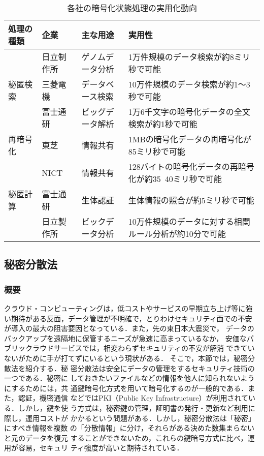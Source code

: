 \begin{table}[htbp]
  \begin{center}
    \small{
    \begin{tabular}{llll}
      \hline
      処理の種類 & 企業 & 主な用途 & 実用性\\
      \hline
      & 日立制作所 & ゲノムデータ分析 & 1万件規模のデータ検索が約8ミリ秒で可能 \cite{hitachi}\\
      秘匿検索 & 三菱電機 & データベース検索 & 10万件規模のデータ検索が約1〜3秒で可能 \cite{mitubisi}\\
      & 富士通研 & ビッグデータ解析 & 1万6千文字の暗号化データの全文検索が約1秒で可能\cite{fujitsu}\\
      \hline
      再暗号化 & 東芝 & 情報共有 & 1MBの暗号化データの再暗号化が85ミリ秒で可能 \\
      & NICT & 情報共有 & 128バイトの暗号化データの再暗号化が約35~40ミリ秒で可能\cite{nict}\\
      \hline
      秘匿計算 & 富士通研 & 生体認証 & 生体情報の照合が約5ミリ秒で可能\cite{fujitsu}\\
      & 日立製作所 & ビックデータ分析 & 10万件規模のデータに対する相関ルール分析が約10分で可能 \cite{hitachi}\\
      \hline
    \end{tabular}
    \label{tab:real}
    \caption{各社の暗号化状態処理の実用化動向}
  }
  \end{center}
\end{table}


\subsection{秘密分散法}
\subsubsection{概要}
クラウド・コンピューティングは，低コストやサービスの早期立ち上げ等に強
い期待がある反面，データ管理が不明確で，とりわけセキュリティ面での不安
が導入の最大の阻害要因となっている．また，先の東日本大震災で，
データのバックアップを遠隔地に保管するニーズが急速に高まっているなか，
安価なパブリックラウドサービスでは，相変わらずセキュリティの不安が解消
できていないがために手が打てずにいるという現状がある．
そこで，本節では，秘密分散法を紹介する．秘
密分散法は安全にデータの管理をするセキュリティ技術の一つである．秘密に
しておきたいファイルなどの情報を他人に知られないようにするためには，共
通鍵暗号化方式を用いて暗号化するのが一般的である．また，認証，機密通信
などではPKI（Public Key Infrastructure）が利用されている．しかし，鍵を使
う方式は，秘密鍵の管理，証明書の発行・更新など利用に際し，運用コストが
かかるという問題がある．しかし，秘密分散法は「秘密」にすべき情報を複数
の「分散情報」に分け，それらがある決めた数集まらないと元のデータを復元
することができないため，これらの鍵暗号方式に比べ，運用が容易，セキュリ
ティ強度が高いと期待されている．

